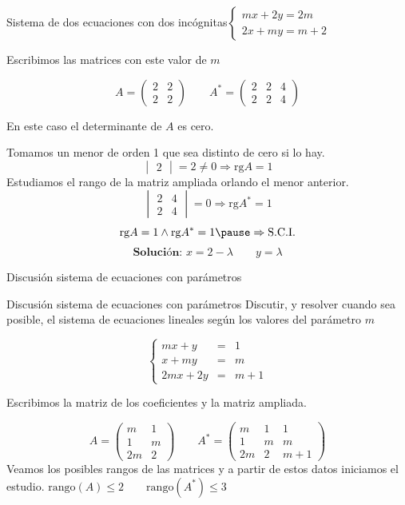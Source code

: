 \documentclass[9pt]{beamer}
\begin{document}
\begin{frame}{Sistema de dos ecuaciones con dos incógnitas$ \begin{cases} mx+2y = 2m \\ 2x+my = m+2 \end{cases}$ }


\pause

Escribimos las matrices con este valor de $m$ 

\pause

\[ A=\begin{pmatrix}
2 & 2  \\ 2 & 2  
\end{pmatrix} \qquad A^*=\begin{pmatrix}
2 & 2 & 4 \\ 2 & 2 & 4 
\end{pmatrix} \]

En este caso el determinante de $A$ es  cero.

Tomamos un menor de orden 1 que sea distinto de cero si lo hay.
\pause
\[ \begin{vmatrix}
2
\end{vmatrix}=2 \neq 0 \Rightarrow \text{rg}A=1 \]
\pause
Estudiamos el rango de la matriz ampliada orlando el menor anterior.
\[ \begin{vmatrix}
2 & 4 \\ 2 & 4 
\end{vmatrix}=  0 \Rightarrow \text{rg}A^* =1 \]
\pause
\[ \text{rg}A=1 \wedge \text{rg}A^* =1 \pause \Rightarrow \text{S.C.I.} \]
\pause
\[ \textbf{Solución: } x= 2-\lambda \qquad y= \lambda \]

\end{frame}

\begin{frame}{Discusión sistema de ecuaciones con parámetros}
\begin{exampleblock}{Discusión sistema de ecuaciones con parámetros}
Discutir, y resolver cuando sea posible, el sistema de ecuaciones lineales según los valores del parámetro $m$

\[ \left\lbrace \begin{array}{rcl}
mx+y & = & 1 \\
x+my & = & m \\
2mx+2y & = & m+1
\end{array} \right. \]
\end{exampleblock}
\pause

Escribimos la matriz de los coeficientes y la matriz ampliada.

\[ A=\begin{pmatrix}
m & 1 \\
1 & m \\
2m & 2
\end{pmatrix} \qquad A^*=\begin{pmatrix}
m & 1 & 1 \\
1 & m & m \\
2m & 2 & m+1
\end{pmatrix} \]
\pause
Veamos los posibles rangos de las matrices y a partir de estos datos iniciamos el estudio.
$\text{rango} (A) \leq 2 \qquad \text{rango} (A^*) \leq 3 $
\pause
\end{frame}
\end{document}
